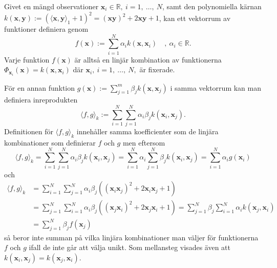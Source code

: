 \documentclass[a4paper, 12pt]{report}
\theoremstyle{definition}
\theoremstyle{remark}
\newcommand{\bfx}{\mathbf{x}}
\newcommand{\bfy}{\mathbf{y}}
\begin{document}
Givet en mängd observationer $\bfx_i\in\mathbb{R},~i=1,~\dots,~N$, samt den polynomiella kärnan $k\left(\bfx, \bfy\right):=\left(\langle \bfx, \bfy \rangle_1 + 1\right)^2 = \left(\bfx\bfy\right)^{2} + 2\bfx\bfy + 1$, kan ett vektorrum av funktioner definiera genom
\begin{equation*}
	f\left(\bfx\right):=\sum_{i=1}^{N}\alpha_ik\left(\bfx, \bfx_i\right)\quad ,~\alpha_i\in\mathbb{R}.
\end{equation*}
Varje funktion $f\left(\bfx\right)$ är alltså en linjär kombination av funktionerna $\Phi_{\bfx_i}\left(\bfx\right)=k\left(\bfx, \bfx_i\right)$ där $\bfx_i,~i=1,~\dots,~N,$ är fixerade. %

För en annan funktion $g\left(\bfx\right):=\sum_{j=1}^{m}\beta_jk\left(\bfx, \bfx_j\right)$ i samma vektorrum kan man definiera inreprodukten
\begin{equation}\label{eq:polykärnaprodukt}
	\langle f , g\rangle_k := \sum_{i=1}^{N}\sum_{j=1}^{N} \alpha_i \beta_j k\left(\bfx_i, \bfx_j\right).
\end{equation}
Definitionen för $\langle f, g \rangle_k$ innehåller samma koefficienter som de linjära kombinationer som definierar $f$ och $g$ men eftersom
\begin{equation}\label{eq:expansion1}
	\langle f, g \rangle_k = \sum_{i=1}^{N} \sum_{j=1}^{N} \alpha_i \beta_j k\left(\bfx_i, \bfx_j\right) = \sum_{i=1}^{N} \alpha_i \sum_{j=1}^{N}\beta_j k\left(\bfx_i, \bfx_j\right)=\sum_{i=1}^{N} \alpha_i g\left(\bfx_i\right)
\end{equation}
och
\begin{equation}\label{eq:expansion2}
\begin{aligned}
	\langle f, g \rangle_k &= \sum_{i=1}^{N} \sum_{j=1}^{N} \alpha_i \beta_j \left(\left(\bfx_i\bfx_j\right)^2 + 2\bfx_i\bfx_j+1\right)\\
	&= \sum_{j=1}^{N} \sum_{i=1}^{N} \alpha_i \beta_j \left(\left(\bfx_j\bfx_i\right)^2 + 2\bfx_j\bfx_i+1\right) = \sum_{j=1}^{N} \beta_j \sum_{i=1}^{N}\alpha_i k\left(\bfx_j, \bfx_i\right) \\
	&= \sum_{j=1}^{N} \beta_j f\left(\bfx_j\right)
\end{aligned}
\end{equation}
så beror inte summan på vilka linjära kombinationer man väljer för funktionerna $f$ och $g$ ifall de inte går att välja unikt. Som mellansteg visades även att $k\left(\bfx_i, \bfx_j\right)=k\left(\bfx_j, \bfx_i\right)$.
\end{document}
